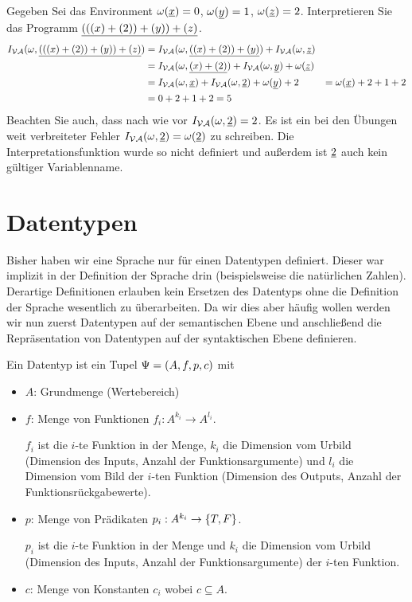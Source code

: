 \begin{bsp}
Gegeben Sei das Environment $\omega(\underline{x})=0$, $\omega(\underline{y})=1$, $\omega(\underline{z})=2$.
Interpretieren Sie das Programm $\underline{(((x)+(2))+(y))+(z)}$.
\begin{align*}
I_{\mathcal{VA}}(\omega,\underline{(((x)+(2))+(y))+(z)}) &= I_{\mathcal{VA}}(\omega,\underline{((x)+(2))+(y)}) + I_{\mathcal{VA}}(\omega,\underline{z}) \\
&= I_{\mathcal{VA}}(\omega,\underline{(x)+(2)}) + I_{\mathcal{VA}}(\omega,\underline{y}) + \omega(\underline{z}) \\
&= I_{\mathcal{VA}}(\omega,\underline{x}) + I_{\mathcal{VA}}(\omega,\underline{2}) + \omega(\underline{y}) + 2
&= \omega(\underline{x}) + 2 + 1 + 2 \\
&= 0 + 2 + 1 + 2 = 5
\end{align*}
Beachten Sie auch, dass nach wie vor $I_{\mathcal{VA}}(\omega,\underline{2})=2$.
Es ist ein bei den Übungen weit verbreiteter Fehler $I_{\mathcal{VA}}(\omega,\underline{2}) = \omega(\underline{2})$ zu schreiben. Die Interpretationsfunktion wurde so nicht definiert und
außerdem ist $\underline{2}$ auch kein gültiger Variablenname.
\end{bsp}

\section{Datentypen}
Bisher haben wir eine Sprache nur für einen Datentypen definiert. Dieser war implizit in der
Definition der Sprache drin (beispielsweise die natürlichen Zahlen). Derartige Definitionen
erlauben kein Ersetzen des Datentyps ohne die Definition der Sprache wesentlich zu überarbeiten.
Da wir dies aber häufig wollen werden wir nun zuerst Datentypen auf der semantischen Ebene
und anschließend die Repräsentation von Datentypen auf der syntaktischen Ebene definieren.
\begin{defn}[Datentyp]
Ein Datentyp ist ein Tupel $\Psi=\left(A,f,p,c\right)$ mit
\begin{itemize}
\item $A$: Grundmenge (Wertebereich)
\item $f$: Menge von Funktionen $f_i: A^{k_i} \to A^{l_i}$.

$f_i$ ist die $i$-te Funktion in der Menge, $k_i$ die Dimension vom Urbild (Dimension des Inputs, Anzahl der Funktionsargumente) und $l_i$
die Dimension vom Bild der $i$-ten Funktion (Dimension des Outputs, Anzahl der Funktionsrückgabewerte).
\item $p$: Menge von Prädikaten $p_i: A^{k_i} \to \left\{T,F\right\}$.

$p_i$ ist die $i$-te Funktion in der Menge und $k_i$ die Dimension vom Urbild (Dimension des Inputs, Anzahl der Funktionsargumente) der $i$-ten Funktion.
\item $c$: Menge von Konstanten $c_i$ wobei $c \subseteq A$.
\end{itemize}
\end{defn}

